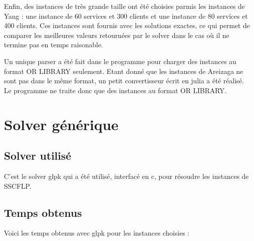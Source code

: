 Enfin, des instances de très grande taille ont été choisies parmis les instances de Yang : une instance de 60 services et 300 clients et une instance de 80 services et 400 clients.
Ces instances sont fournis avec les solutions exactes, ce qui permet de comparer les meilleures valeurs retournées par le solver dans le cas où il ne termine pas en temps raisonable. \newline

Un unique parser a été fait dans le programme pour charger des instances au format OR LIBRARY seulement.
Etant donné que les instances de Areizaga ne sont pas dans le même format, un petit convertisseur écrit en julia a été réalisé. Le programme ne traite donc que des instances au format OR LIBRARY.

\section{Solver générique}

\subsection{Solver utilisé}

C'est le solver glpk qui a été utilisé, interfacé en c, pour résoudre les instances de SSCFLP.

\subsection{Temps obtenus}

Voici les temps obtenus avec glpk pour les instances choisies :
